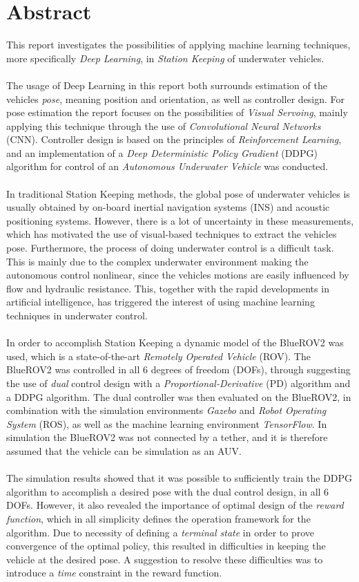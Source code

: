 \section*{Abstract}
This report investigates the possibilities of applying machine learning techniques, more specifically \textit{Deep Learning}, in \textit{Station Keeping} of underwater vehicles.\\\\The usage of Deep Learning in this report both surrounds estimation of the vehicles \textit{pose}, meaning position and orientation, as well as controller design. For pose estimation the report focuses on the possibilities of \textit{Visual Servoing}, mainly applying this technique through the use of \textit{Convolutional Neural Networks} (CNN). Controller design is based on the principles of \textit{Reinforcement Learning}, and an implementation of a \textit{Deep Deterministic Policy Gradient} (DDPG) algorithm for control of an \textit{Autonomous Underwater Vehicle} was conducted.\\\\
In traditional Station Keeping methods, the global pose of underwater vehicles is usually obtained by on-board inertial navigation systems (INS) and acoustic positioning systems. However, there is a lot of uncertainty in these measurements, which has motivated the use of visual-based techniques to extract the vehicles pose. Furthermore, the process of doing underwater control is a difficult task. This is mainly due to the complex underwater environment making the autonomous control nonlinear, since the vehicles motions are easily influenced by flow and hydraulic resistance. This, together with the rapid developments in artificial intelligence, has triggered the interest of using machine learning techniques in underwater control.\\\\
In order to accomplish Station Keeping a dynamic model of the BlueROV2 was used, which is a state-of-the-art \textit{Remotely Operated Vehicle} (ROV). The BlueROV2 was controlled in all 6 degrees of freedom (DOFs), through suggesting the use of \textit{dual} control design with a \textit{Proportional-Derivative} (PD) algorithm and a DDPG algorithm. The dual controller was then evaluated on the BlueROV2, in combination with the simulation environments \textit{Gazebo} and \textit{Robot Operating System} (ROS), as well as the machine learning environment \textit{TensorFlow}. In simulation the BlueROV2 was not connected by a tether, and it is therefore assumed that the vehicle can be simulation as an AUV.\\\\
The simulation results showed that it was possible to sufficiently train the DDPG algorithm to accomplish a desired pose with the dual control design, in all 6 DOFs. However, it also revealed the importance of optimal design of the \textit{reward function}, which in all simplicity defines the operation framework for the algorithm. Due to necessity of defining a \textit{terminal state} in order to prove convergence of the optimal policy, this resulted in difficulties in keeping the vehicle at the desired pose. A suggestion to resolve these difficulties was to introduce a \textit{time} constraint in the reward function. 